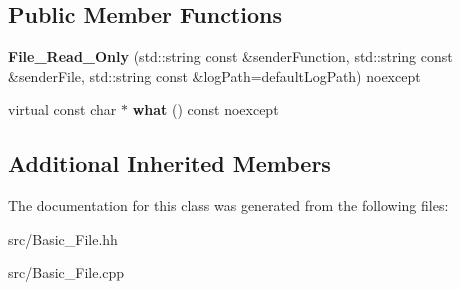 \subsection*{Public Member Functions}
\begin{DoxyCompactItemize}
\item 
\hypertarget{classstb_1_1File__Read__Only_a540e07bb37f4042fcd8ac58e70d028fc}{{\bfseries File\+\_\+\+Read\+\_\+\+Only} (std\+::string const \&sender\+Function, std\+::string const \&sender\+File, std\+::string const \&log\+Path=default\+Log\+Path) noexcept}\label{classstb_1_1File__Read__Only_a540e07bb37f4042fcd8ac58e70d028fc}

\item 
\hypertarget{classstb_1_1File__Read__Only_af99f9715f73361dd6b7b1459dde67ffa}{virtual const char $\ast$ {\bfseries what} () const noexcept}\label{classstb_1_1File__Read__Only_af99f9715f73361dd6b7b1459dde67ffa}

\end{DoxyCompactItemize}
\subsection*{Additional Inherited Members}


The documentation for this class was generated from the following files\+:\begin{DoxyCompactItemize}
\item 
src/Basic\+\_\+\+File.\+hh\item 
src/Basic\+\_\+\+File.\+cpp\end{DoxyCompactItemize}
